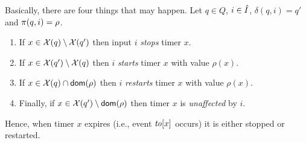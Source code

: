 Basically, there are four things that may happen.
Let $q \in Q$, $i \in \hat{I}$, $\delta(q,i)=q'$ and $\pi(q,i)=\rho$.
\begin{enumerate}
\item
If $x \in\mathcal{X}(q) \setminus \mathcal{X}(q')$ then input $i$ \emph{stops} timer $x$.
\item
If $x \in \mathcal{X}(q') \setminus \mathcal{X}(q)$ then $i$ \emph{starts} timer $x$ with value $\rho(x)$.
\item
If $x \in \mathcal{X}(q) \cap {\textsf{dom}}(\rho)$ then $i$ \emph{restarts} timer $x$ with value $\rho(x)$.
\item
Finally, if $x \in \mathcal{X}(q') \setminus {\textsf{dom}}(\rho)$ then timer $x$ is \emph{unaffected} by $i$.
\end{enumerate}
Hence, when timer $x$ expires (i.e., event $\mathit{to}[x]$ occurs) it is either stopped or restarted.

